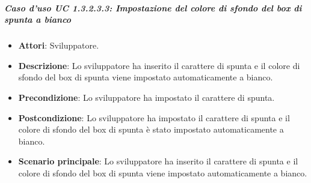 \subparagraph{Caso d'uso UC 1.3.2.3.3: Impostazione del colore di sfondo del box di spunta a bianco}

\FloatBarrier
\begin{itemize}
\item\textbf{Attori}: Sviluppatore.
\item\textbf{Descrizione}: Lo sviluppatore ha inserito il carattere di spunta e il colore di sfondo del box di spunta viene impostato automaticamente a bianco.
\item\textbf{Precondizione}: Lo sviluppatore ha impostato il carattere di spunta.
\item\textbf{Postcondizione}: Lo sviluppatore ha impostato il carattere di spunta e il colore di sfondo del box di spunta è stato impostato automaticamente a bianco.
\item\textbf{Scenario principale}: Lo sviluppatore ha inserito il carattere di spunta e il colore di sfondo del box di spunta viene impostato automaticamente a bianco.
\end{itemize}